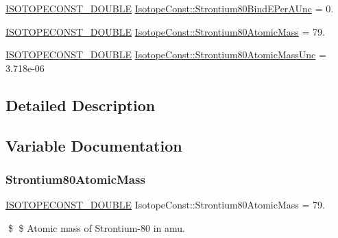 \begin{DoxyCompactItemize}
\mbox{\hyperlink{group___isotope_const-_macros_ga8f45a7272ce02c0b4c65c44636ed719a}{I\+S\+O\+T\+O\+P\+E\+C\+O\+N\+S\+T\+\_\+\+D\+O\+U\+B\+LE}} \mbox{\hyperlink{group___isotope_const-_strontium-_sr80_ga8ac2ef36f8a1ee3d4615ab43f6077832}{Isotope\+Const\+::\+Strontium80\+Bind\+E\+Per\+A\+Unc}} = 0.
\item 
\mbox{\hyperlink{group___isotope_const-_macros_ga8f45a7272ce02c0b4c65c44636ed719a}{I\+S\+O\+T\+O\+P\+E\+C\+O\+N\+S\+T\+\_\+\+D\+O\+U\+B\+LE}} \mbox{\hyperlink{group___isotope_const-_strontium-_sr80_gad92ffa7c66178043ff740831eb43ff2b}{Isotope\+Const\+::\+Strontium80\+Atomic\+Mass}} = 79.
\item 
\mbox{\hyperlink{group___isotope_const-_macros_ga8f45a7272ce02c0b4c65c44636ed719a}{I\+S\+O\+T\+O\+P\+E\+C\+O\+N\+S\+T\+\_\+\+D\+O\+U\+B\+LE}} \mbox{\hyperlink{group___isotope_const-_strontium-_sr80_gadec2b2064fafda147f43e28d6442f883}{Isotope\+Const\+::\+Strontium80\+Atomic\+Mass\+Unc}} = 3.\+718e-\/06
\end{DoxyCompactItemize}


\subsection{Detailed Description}


\subsection{Variable Documentation}
\mbox{\label{group___isotope_const-_strontium-_sr80_gad92ffa7c66178043ff740831eb43ff2b}} 
\subsubsection{\texorpdfstring{Strontium80\+Atomic\+Mass}{Strontium80AtomicMass}}
{\footnotesize\ttfamily \mbox{\hyperlink{group___isotope_const-_macros_ga8f45a7272ce02c0b4c65c44636ed719a}{I\+S\+O\+T\+O\+P\+E\+C\+O\+N\+S\+T\+\_\+\+D\+O\+U\+B\+LE}} Isotope\+Const\+::\+Strontium80\+Atomic\+Mass = 79.}

\$ \$ Atomic mass of Strontium-\/80 in amu. \mbox{\label{group___isotope_const-_strontium-_sr80_gadec2b2064fafda147f43e28d6442f883}} 
